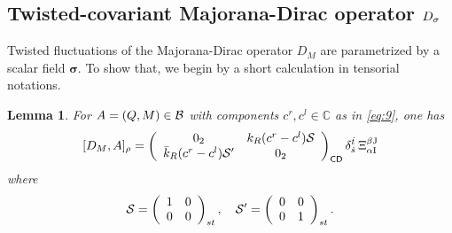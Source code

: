 \documentclass[11pt]{article}
\newcommand{\sig}{{\boldsymbol{\sigma}}}
\newcommand{\sI}{\mathrm  I}
\newcommand{\sJ}{\mathrm J}
\newcommand{\sC}{\mathsf C}
\newcommand{\sD}{\mathsf D}
\newtheorem{lemma}[prop]{Lemma}
\begin{document}
\subsection{Twisted-covariant Majorana-Dirac operator $D_{\bf
    \sigma}$}

Twisted fluctuations of the Majorana-Dirac operator
$D_M$ are parametrized by a scalar field
$\sig$. To show that, we begin by a short calculation in tensorial notations.
\label{soussectionsigma}
\begin{lemma}
\label{lemmaoneformsingle}
  For  $A=(Q,M)\in {\cal B}$ with components $c^r, c^l\in\mathbb
  C$ as in \eqref{eq:9}, one has
  \begin{equation}
    \label{eq:34}
    [D_M, A]_\rho = \left(\begin{array}{cc}
0_2 & k_R(c^r - c^l) {\cal S} \\ \bar k_R(c^r - c^l)
{\cal S}'&0_2\end{array}\right)_{\sC\sD}\delta_{\dot s}^{\dot t}\,\Xi_{\alpha\sI}^{\beta\sJ}
  \end{equation}
where \begin{equation}
  \label{eq:107}
  {\cal S}= \left(\begin{array}{cc} 1 & 0
      \\ 0&0\end{array}\right)_{st},\quad
  {{\cal S}'} = \left(\begin{array}{cc} 0&0 \\
      0& 1\end{array}\right)_{st}. 
\end{equation}
\end{lemma}
\end{document}
